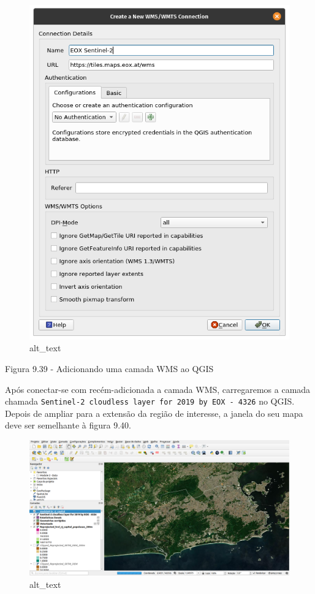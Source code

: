 \documentclass[
  portuguese,
]{krantz}
\begin{document}
\begin{figure}
\centering
\includegraphics{media/modulo9/fig939.png}
\caption{alt\_text}
\end{figure}

Figura 9.39 - Adicionando uma camada WMS ao QGIS

Após conectar-se com recém-adicionada a camada WMS, carregaremos a camada chamada \texttt{Sentinel-2\ cloudless\ layer\ for\ 2019\ by\ EOX\ -\ 4326} no QGIS. Depois de ampliar para a extensão da região de interesse, a janela do seu mapa deve ser semelhante à figura 9.40.

\begin{figure}
\centering
\includegraphics{media/modulo9/fig940.png}
\caption{alt\_text}
\end{figure}
\end{document}
